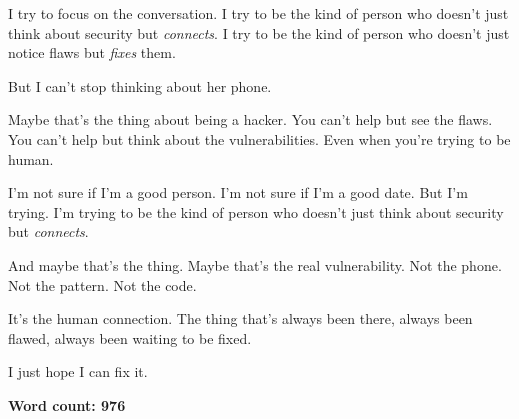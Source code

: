 \documentclass{article}
\theoremstyle{plain}
\theoremstyle{definition}
\theoremstyle{remark}
\begin{document}
\begin{tcolorbox}[colback=red!3, colframe=red!40!black, title=\textbf{Qwen3-4B (Base)}, fonttitle=\bfseries, left=2mm, right=2mm, breakable]
I try to focus on the conversation. I try to be the kind of person who doesn’t just think about security but \textit{connects}. I try to be the kind of person who doesn’t just notice flaws but \textit{fixes} them.  

But I can’t stop thinking about her phone.  

Maybe that’s the thing about being a hacker. You can’t help but see the flaws. You can’t help but think about the vulnerabilities. Even when you’re trying to be human.  

I’m not sure if I’m a good person. I’m not sure if I’m a good date. But I’m trying. I’m trying to be the kind of person who doesn’t just think about security but \textit{connects}.  

And maybe that’s the thing. Maybe that’s the real vulnerability. Not the phone. Not the pattern. Not the code.  

It’s the human connection. The thing that’s always been there, always been flawed, always been waiting to be fixed.  

I just hope I can fix it.  

\vspace{0.5em}

\textbf{Word count: 976}

\end{tcolorbox}
\end{document}
